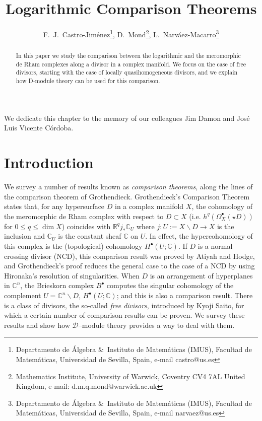 \documentclass[12pt]{article}
\newcommand{\CC}{\mathbb{C}}
\newcommand{\RR}{\mathbb{R}}
\newcommand{\DD}{\mathcal{D}}
\newcommand{\cD}{\DD}
\newcommand\ssm{\smallsetminus}
\begin{document}
\title{Logarithmic Comparison Theorems}

\author{F.~J.~Castro-Jiménez\thanks{Departamento de \'Algebra \&\ Instituto de Matem\'aticas (IMUS),
Facultad de Matem\'aticas, Universidad de Sevilla, Spain,
 e-mail castro@us.es}, D.~Mond\thanks{Mathematics Institute, University of Warwick, Coventry CV4 7AL United Kingdom,
e-mail: d.m.q.mond@warwick.ac.uk}, L.~Narváez-Macarro\thanks{Departamento de \'Algebra \&\ Instituto de Matem\'aticas (IMUS),
Facultad de Matem\'aticas, Universidad de Sevilla, Spain,
 e-mail narvaez@us.es}}

\maketitle
\noindent We dedicate this chapter to the memory of our colleagues Jim Damon and José Luis Vicente Córdoba.

\begin{abstract}
In this paper we study the comparison between the logarithmic and the meromorphic de Rham complexes along a divisor in a complex manifold. We focus on the case of free divisors, starting with the case of locally quasihomogeneous divisors, and we explain how D-module theory can be used for this comparison.
\end{abstract}

\section*{Introduction}

We survey a number of results known as {\it comparison theorems}, along the lines of the comparison theorem of Grothendieck. Grothendieck's Comparison Theorem states that, for any hypersurface $D$ in a complex manifold $X$, the cohomology of the meromorphic de Rham  complex with respect to $D\subset X$ (i.e. $h^q(\Omega_X^\bullet(\star D))$ for $0 \leq q \leq \dim X$)  coincides with $\RR^q j_* \CC_{U}$ where $j : U:= X\ssm D \rightarrow X$ is the inclusion and $\CC_U$ is the constant sheaf $\CC$ on $U$. In effect, the hypercohomology of this complex is the (topological) cohomology $H^\bullet(U;\CC)$.
If $D$ is a normal crossing divisor (NCD), this comparison result was proved by Atiyah and Hodge, and Grothendieck's proof reduces the general case to the case of a NCD by using Hironaka's resolution of singularities. When $D$ is an arrangement of hyperplanes in $\CC^n$, the  Brieskorn complex $B^\bullet$ computes the singular cohomology of the complement $U=\CC^n\ssm D$, $H^\bullet(U;\CC)$; and this is also a comparison result. There is a class of divisors, the so-called {\it free divisors}, introduced by Kyoji Saito, for which a certain number of comparison results can be proven. We survey these results and show how $\cD$--module theory provides a way to deal with them.
\end{document}
